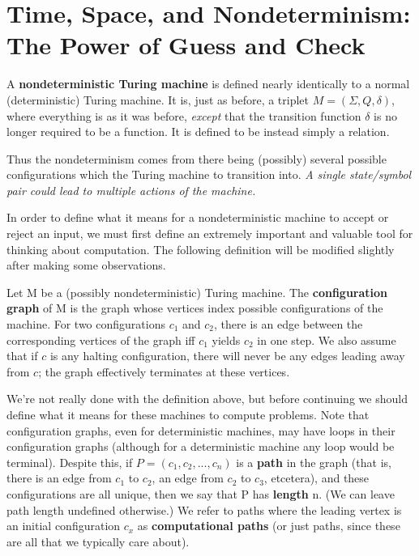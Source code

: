 \section{Time, Space, and Nondeterminism: The Power of Guess and Check}
\begin{definition}
A \textbf{nondeterministic Turing machine} is defined nearly identically to a normal (deterministic) Turing machine. It is, just as before, a triplet $M=(\Sigma, Q, \delta)$, where everything is as it was before, \textit{except} that the transition function $\delta$ is no longer required to be a function. It is defined to be instead simply a relation.
\end{definition}
Thus the nondeterminism comes from there being (possibly) several possible configurations which the Turing machine to transition into. \textit{A single state/symbol pair could lead to multiple actions of the machine.}
\par In order to define what it means for a nondeterministic machine to accept or reject an input, we must first define an extremely important and valuable tool for thinking about computation. The following definition will be modified slightly after making some observations.
\begin{definition}
Let M be a (possibly nondeterministic) Turing machine. The \textbf{configuration graph} of M is the graph whose vertices index possible configurations of the machine. For two configurations $c_1$ and $c_2$, there is an edge between the corresponding vertices of the graph iff $c_1$ yields $c_2$ in one step. We also assume that if $c$ is any halting configuration, there will never be any edges leading away from $c$; the graph effectively terminates at these vertices.
\end{definition}
We're not really done with the definition above, but before continuing we should define what it means for these machines to compute problems. Note that configuration graphs, even for deterministic machines, may have loops in their configuration graphs (although for a deterministic machine any loop would be terminal). Despite this, if $P = (c_1,c_2,...,c_n)$ is a \textbf{path} in the graph (that is, there is an edge from $c_1$ to $c_2$, an edge from $c_2$ to $c_3$, etcetera), and these configurations are all unique, then we say that P has \textbf{length} n. (We can leave path length undefined otherwise.) We refer to paths where the leading vertex is an initial configuration $c_x$ as \textbf{computational paths} (or just paths, since these are all that we typically care about).
